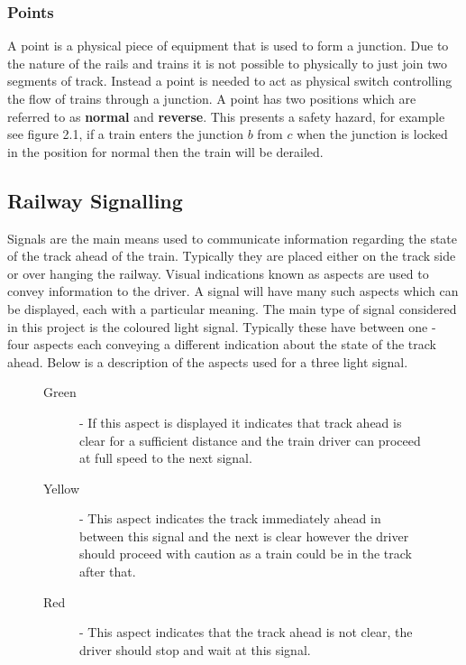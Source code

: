 \subsubsection{Points}
A point is a physical piece of equipment that is used to 
form a junction. Due to the nature of the rails and trains it is not possible to physically
to just join two segments of track. Instead a point is needed to act as
physical switch controlling the flow of trains through a junction. A point
has two positions which are referred to as \textbf{normal} and
\textbf{reverse}. This presents a safety hazard, for example see figure 2.1, if a train enters
the junction $b$ from $c$ when the junction is locked in the
position for normal then the train will be derailed. 



\subsection{Railway Signalling}
Signals are the main means used to communicate information regarding the state
of the track ahead of the train. Typically they are placed either on the track
side or over hanging the railway. Visual indications known as aspects are used
to convey information to the driver. A signal will have many such aspects
which can be displayed, each with a particular meaning. The main type of signal
considered in this project is the coloured light signal. Typically these have
between one - four aspects each conveying a different indication about the state of
the track ahead. Below is a description of the
aspects used for a three light signal.  


\begin{figure}[h!]
\begin{description}

\item[Green] - If this aspect is displayed it indicates that track ahead is
  clear for a sufficient distance and the train driver
  can proceed at full speed to the next signal.

\item[Yellow] - This aspect indicates the track immediately ahead in between
  this signal and the next is clear however the driver should proceed with
  caution as a train could be in the track after that.

\item[Red] - This aspect indicates that the track ahead is not clear, the
  driver should stop and wait at this signal.

\end{description}
\label{fig:3lightsignal}


\end{figure}

